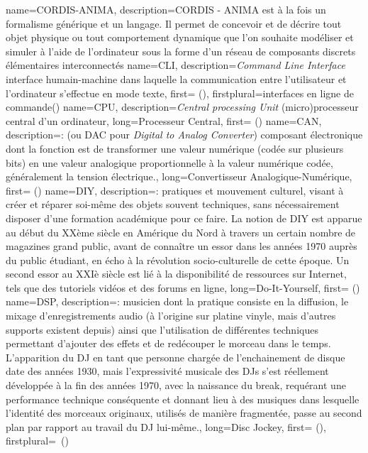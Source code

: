 {
    name={CORDIS-ANIMA},
    description={CORDIS - ANIMA est à la fois un formalisme générique et un langage. Il permet de concevoir et de décrire tout objet physique ou tout comportement dynamique que l'on souhaite modéliser et simuler à l'aide de l'ordinateur sous la forme d'un réseau de composants discrets élémentaires interconnectés}
}
{
    name={CLI},
    description={\textit{Command Line Interface} interface humain-machine dans laquelle la communication entre l'utilisateur et l'ordinateur s'effectue en mode texte},
    first={ ()},
    firstplural={interfaces en ligne de commande(\glspluralsuffix)}
}
{
    name={CPU},
    description={\textit{Central processing Unit} (micro)processeur central d'un ordinateur},
    long={Processeur Central},
    first={ ()}
}
{
    name={CAN},
    description={\textit{}: (ou DAC pour \textit{Digital to Analog Converter}) composant électronique dont la fonction est de transformer une valeur numérique (codée sur plusieurs bits) en une valeur analogique proportionnelle à la valeur numérique codée, généralement la tension électrique.},
    long={Convertisseur Analogique-Numérique},
    first={ ()}
}
{
    name={DIY},
    description={\textit{}: pratiques et mouvement culturel, visant à créer et réparer soi-même des objets souvent techniques, sans nécessairement disposer d'une formation académique pour ce faire. La notion de DIY est apparue au début du XXème siècle en Amérique du Nord à travers un certain nombre de magazines grand public, avant de connaître un essor dans les années 1970 auprès du public étudiant, en écho à la révolution socio-culturelle de cette époque. Un second essor au XXIè siècle est lié à la disponibilité de ressources sur Internet, tels que des tutoriels vidéos et des forums en ligne},
    long={Do-It-Yourself},
    first={ ()}
}
{
    name={DSP},
    description={\textit{}: musicien dont la pratique consiste en la diffusion, le mixage d'enregistrements audio (à l'origine sur platine vinyle, mais d'autres supports existent depuis) ainsi que l'utilisation de différentes techniques permettant d'ajouter des effets et de redécouper le morceau dans le temps. L'apparition du DJ en tant que personne chargée de l'enchainement de disque date des années 1930, mais l'expressivité musicale des DJs s'est réellement développée à la fin des années 1970, avec la naissance du break, requérant une performance technique conséquente et donnant lieu à des musiques dans lesquelle l'identité des morceaux originaux, utilisés de manière fragmentée, passe au second plan par rapport au travail du DJ lui-même.},
    long={Disc Jockey},
    first={ ()},
    firstplural={\glspluralsuffix\ (\glspluralsuffix)}
}
